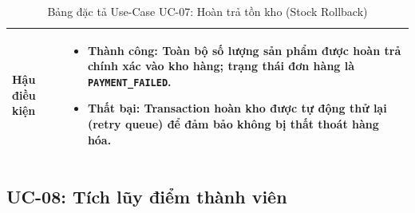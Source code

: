 \documentclass[12pt,a4paper]{article}
\begin{document}
\begin{table}[H]
\begin{tabularx}{\textwidth}{|>{\bfseries\raggedright\arraybackslash}p{3.2cm}|>{\raggedright\arraybackslash}X|}
\hline
Hậu điều kiện & 
\begin{itemize}[leftmargin=*,itemsep=2pt,topsep=2pt,parsep=0pt,partopsep=0pt]
    \item \textbf{Thành công:} Toàn bộ số lượng sản phẩm được hoàn trả chính xác vào kho hàng; trạng thái đơn hàng là \texttt{PAYMENT\_FAILED}.
    \item \textbf{Thất bại:} Transaction hoàn kho được tự động thử lại (retry queue) để đảm bảo không bị thất thoát hàng hóa.
\end{itemize} \\
\hline
\end{tabularx}
\caption{Bảng đặc tả Use-Case UC-07: Hoàn trả tồn kho (Stock Rollback)}
\label{tab:uc-07}
\end{table}

\subsection{UC-08: Tích lũy điểm thành viên}
\end{document}
